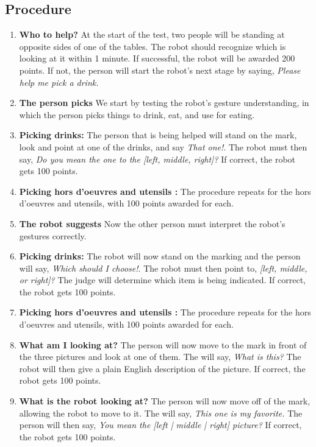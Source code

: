 %
%
\subsection{Procedure}
\begin{enumerate}
	\item \textbf{Who to help?} At the start of the test, two people will be standing at opposite sides of one of the tables. The robot should recognize which is looking at it within 1 minute. If successful, the robot will be awarded 200 points. If not, the person will start the robot's next stage by saying, \textit{Please help me pick a drink.}

	\item \textbf{The person picks} We start by testing the robot's gesture understanding, in which the person picks things to drink, eat, and use for eating.

	\item \textbf{Picking drinks:} The person that is being helped will stand on the mark, look and point at one of the drinks, and say \textit{That one!}. The robot must then say, \textit{Do you mean the one to the [left, middle, right]?} If correct, the robot gets 100 points.

	\item \textbf{Picking hors d'oeuvres and utensils :} The procedure repeats for the hors d'oeuvres and utensils, with 100 points awarded for each.

	\item \textbf{The robot suggests} Now the other person must interpret the robot's gestures correctly.

	\item \textbf{Picking drinks:} The robot will now stand on the marking and the person will say, \textit{Which should I choose!}. The robot must then point to, \textit{[left, middle, or right]?} The judge will determine which item is being indicated. If correct, the robot gets 100 points.

	\item \textbf{Picking hors d'oeuvres and utensils :} The procedure repeats for the hors d'oeuvres and utensils, with 100 points awarded for each.

	\item \textbf{What am I looking at?} The person will now move to the mark in front of the three pictures and look at one of them. The will say, \textit{What is this?} The robot will then give a plain English description of the picture. If correct, the robot gets 100 points.

	\item \textbf{What is the robot looking at?} The person will now move off of the mark, allowing the robot to move to it. The will say, \textit{This one is my favorite.} The person will then say, \textit{You mean the [left | middle | right] picture?} If correct, the robot gets 100 points.

\end{enumerate}


